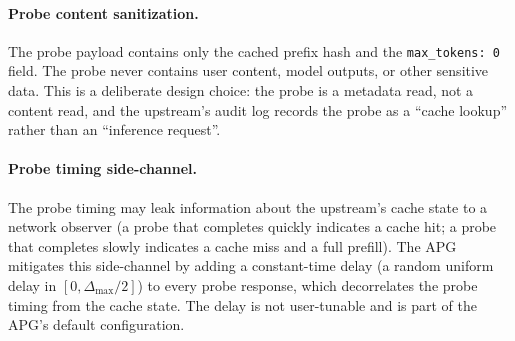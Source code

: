 \paragraph{Probe content sanitization.}
The probe payload contains only the cached prefix hash and the
\texttt{max\_tokens: 0} field. The probe never contains user
content, model outputs, or other sensitive data. This is a deliberate
design choice: the probe is a metadata read, not a content read, and
the upstream's audit log records the probe as a ``cache lookup''
rather than an ``inference request''.

\paragraph{Probe timing side-channel.}
The probe timing may leak information about the upstream's cache
state to a network observer (a probe that completes quickly
indicates a cache hit; a probe that completes slowly indicates a
cache miss and a full prefill). The APG mitigates this side-channel
by adding a constant-time delay (a random uniform delay in
$[0, \Delta_{\max}/2]$) to every probe response, which decorrelates
the probe timing from the cache state. The delay is not user-tunable
and is part of the APG's default configuration.

